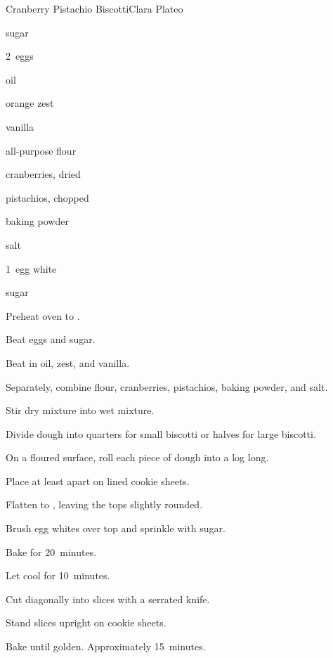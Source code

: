 \begin{recipe}{Cranberry Pistachio Biscotti}{Clara Plateo}{}

\begin{ingredients}
\item \C{\threequarter} sugar
\item 2~eggs
\item \C{\quarter} oil
\item \tp{1\half} orange zest
\item \tp{1\half} vanilla
\item {} all-purpose flour
\item \C{\half} cranberries, dried
\item \C{\half} pistachios, chopped
\item {} baking powder
\item \tp{\quarter} salt
\item 1~egg white
\item {} sugar
\end{ingredients}

\begin{directions}
\item Preheat oven to .
\item Beat eggs and \C{\threequarter} sugar.
\item Beat in oil, zest, and vanilla.
\item Separately, combine flour, cranberries, pistachios, baking powder, and salt.
\item Stir dry mixture into wet mixture.
\item Divide dough into quarters for small biscotti or halves for large biscotti.
\item On a floured surface, roll each piece of dough into a log  long.
\item Place at least  apart on lined cookie sheets.
\item Flatten to \inch{\threequarter}, leaving the tops slightly rounded.
\item Brush egg whites over top and sprinkle with sugar.
\item Bake for 20~minutes.
\item Let cool for 10~minutes.
\item Cut diagonally into \inch{\half} slices with a serrated knife.
\item Stand slices upright on cookie sheets.
\item Bake until golden. Approximately 15~minutes.
\end{directions}

\end{recipe}
